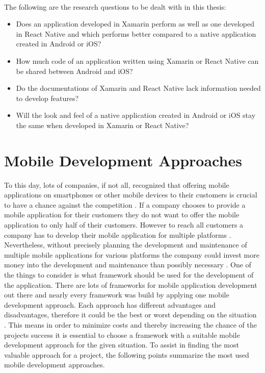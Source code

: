 \documentclass[Bachelor,BIF,english]{twbook}
\begin{document}
\\[\baselineskip]
The following are the research questions to be dealt with in this thesis:
\begin{itemize}
\item Does an application developed in Xamarin perform as well as one developed in React Native and which performs better compared to a native application created in Android or iOS?
\item How much code of an application written using Xamarin or React Native can be shared between Android and iOS?
\item Do the documentations of Xamarin and React Native lack information needed to develop features?
\item Will the look and feel of a native application created in Android or iOS stay the same when developed in Xamarin or React Native?
\end{itemize}

\chapter{Mobile Development Approaches}
To this day, lots of companies, if not all, recognized that offering mobile applications on smartphones or other mobile devices to their customers is crucial to have a chance against the competition \cite[p.~1]{7479278}. If a company chooses to provide a mobile application for their customers they do not want to offer the mobile application to only half of their customers. However to reach all customers a company has to develop their mobile application for multiple platforms \cite[p.~5]{Steczko2016}.
\\[\baselineskip]
Nevertheless, without precisely planning the development and maintenance of multiple mobile applications for various platforms the company could invest more money into the development and maintenance than possibly necessary \cite[p.~1]{JohanssonSderberg2018} \cite[p.~8]{Steczko2016} \cite[p.~757]{Ciman2014}. One of the things to consider is what framework should be used for the development of the application. There are lots of frameworks for mobile application development out there and nearly every framework was build by applying one mobile development approach. Each approach has different advantages and disadvantages, therefore it could be the best or worst depending on the situation \cite{6420693} \cite{7934674}. This means in order to minimize costs and thereby increasing the chance of the projects success it is essential to choose a framework with a suitable mobile development approach for the given situation. To assist in finding the most valuable approach for a project, the following points summarize the most used mobile development approaches. 
\end{document}
